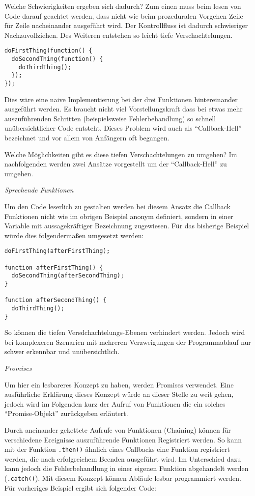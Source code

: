 \documentclass[]{article}
\begin{document}
Welche Schwierigkeiten ergeben sich dadurch? Zum einen muss beim lesen
von Code darauf geachtet werden, dass nicht wie beim prozeduralen
Vorgehen Zeile für Zeile nacheinander ausgeführt wird. Der Kontrollfluss
ist dadurch schwieriger Nachzuvollziehen. Des Weiteren entstehen so
leicht tiefe Verschachtelungen.

\begin{verbatim}
doFirstThing(function() {
  doSecondThing(function() {
    doThirdThing();
  });
}); 
\end{verbatim}

Dies wäre eine naive Implementierung bei der drei Funktionen
hintereinander ausgeführt werden. Es braucht nicht viel
Vorstellungskraft dass bei etwas mehr auszuführenden Schritten
(beispielsweise Fehlerbehandlung) so schnell unübersichtlicher Code
entsteht. Dieses Problem wird auch als ``Callback-Hell'' bezeichnet und
vor allem von Anfängern oft begangen.

Welche Möglichkeiten gibt es diese tiefen Verschachtelungen zu umgehen?
Im nachfolgenden werden zwei Ansätze vorgestellt um der
``Callback-Hell'' zu umgehen.

\emph{Sprechende Funktionen}

Um den Code leserlich zu gestalten werden bei diesem Ansatz die Callback
Funktionen nicht wie im obrigen Beispiel anonym definiert, sondern in
einer Variable mit aussagekräftiger Bezeichnung zugewiesen. Für das
bisherige Beispiel würde dies folgendermaßen umgesetzt werden:

\begin{verbatim}
doFirstThing(afterFirstThing);

function afterFirstThing() {
  doSecondThing(afterSecondThing);
}

function afterSecondThing() {
  doThirdThing();
}
\end{verbatim}

So können die tiefen Versdchachtelungs-Ebenen verhindert werden. Jedoch
wird bei komplexeren Szenarien mit mehreren Verzweigungen der
Programmablauf nur schwer erkennbar und unübersichtlich.

\emph{Promises}

Um hier ein lesbareres Konzept zu haben, werden Promises verwendet. Eine
ausführliche Erklärung dieses Konzept würde an dieser Stelle zu weit
gehen, jedoch wird im Folgenden kurz der Aufruf von Funktionen die ein
solches ``Promise-Objekt'' zurückgeben erläutert.

Durch aneinander gekettete Aufrufe von Funktionen (Chaining) können für
verschiedene Ereignisse auszuführende Funktionen Registriert werden. So
kann mit der Funktion \texttt{.then()} ähnlich eines Callbacks eine
Funktion registriert werden, die nach erfolgreichem Beenden ausgeführt
wird. Im Unterschied dazu kann jedoch die Fehlerbehandlung in einer
eigenen Funktion abgehandelt werden (\texttt{.catch()}). Mit diesem
Konzept können Abläufe lesbar programmiert werden. Für vorheriges
Beispiel ergibt sich folgender Code:
\end{document}
